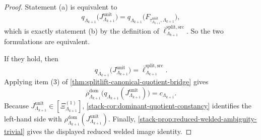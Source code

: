 \documentclass[11pt]{article}
\theoremstyle{definition}
\theoremstyle{plain}
\theoremstyle{remark}
\newcommand{\1}{\mathbf 1}
\begin{document}
\begin{proof}
Statement \textnormal{(a)} is equivalent to
\[
q_{\Lambda_{k+1}}
\!\bigl(
J^{\mathrm{unit}}_{\Lambda_{k+1}}
\bigr)
=
q_{\Lambda_{k+1}}
\!\bigl(
F_{\tau^{\mathrm{unit}}_{\Lambda_{k+1}},\Lambda_{k+1}}
\bigr),
\]
which is exactly statement \textnormal{(b)} by the definition of
\(
\overline\ell^{\mathrm{split,src}}_{\Lambda_{k+1}}
\).
So the two formulations are equivalent.

If they hold, then
\[
q_{\Lambda_{k+1}}
\!\bigl(
J^{\mathrm{unit}}_{\Lambda_{k+1}}
\bigr)
=
\overline\ell^{\mathrm{split,src}}_{\Lambda_{k+1}}.
\]
Applying item \textnormal{(3)} of \cref{thm:splitlift-canonical-quotient-bridge} gives
\[
\overline{\rho}^{\mathrm{dom}}_{\Lambda_{k+1}}
\!\bigl(
q_{\Lambda_{k+1}}(J^{\mathrm{unit}}_{\Lambda_{k+1}})
\bigr)
=
c_{\Lambda_{k+1}}.
\]
Because
\(
J^{\mathrm{unit}}_{\Lambda_{k+1}}
\in
[\Xi^{(1)}_{\Lambda_{k+1}}]
\),
\cref{stack-cor:dominant-quotient-constancy} identifies the left-hand side with
\(
\rho^{\mathrm{dom}}_{\Lambda_{k+1}}(J^{\mathrm{unit}}_{\Lambda_{k+1}})
\).
Finally,
\cref{stack-prop:reduced-welded-ambiguity-trivial}
gives the displayed reduced welded image identity.
\end{proof}
\end{document}
